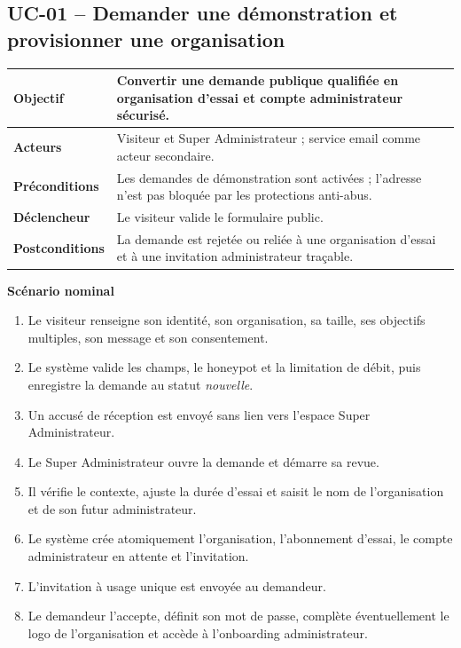 \subsection{UC-01 -- Demander une démonstration et provisionner une organisation}

\begin{table}[H]
  \centering
  \begin{tabularx}{\textwidth}{|C{3.3cm}|Y|}
    \hline
    \textbf{Objectif} & Convertir une demande publique qualifiée en organisation
    d'essai et compte administrateur sécurisé.\\\hline
    \textbf{Acteurs} & Visiteur et Super Administrateur ; service email comme acteur
    secondaire.\\\hline
    \textbf{Préconditions} & Les demandes de démonstration sont activées ; l'adresse
    n'est pas bloquée par les protections anti-abus.\\\hline
    \textbf{Déclencheur} & Le visiteur valide le formulaire public.\\\hline
    \textbf{Postconditions} & La demande est rejetée ou reliée à une organisation
    d'essai et à une invitation administrateur traçable.\\\hline

  \end{tabularx}
\end{table}

\textbf{Scénario nominal}
\begin{enumerate}[leftmargin=8mm]
  \item Le visiteur renseigne son identité, son organisation, sa taille, ses objectifs
  multiples, son message et son consentement.
  \item Le système valide les champs, le honeypot et la limitation de débit, puis
  enregistre la demande au statut \emph{nouvelle}.
  \item Un accusé de réception est envoyé sans lien vers l'espace Super Administrateur.
  \item Le Super Administrateur ouvre la demande et démarre sa revue.
  \item Il vérifie le contexte, ajuste la durée d'essai et saisit le nom de
  l'organisation et de son futur administrateur.
  \item Le système crée atomiquement l'organisation, l'abonnement d'essai, le compte
  administrateur en attente et l'invitation.
  \item L'invitation à usage unique est envoyée au demandeur.
  \item Le demandeur l'accepte, définit son mot de passe, complète éventuellement le
  logo de l'organisation et accède à l'onboarding administrateur.
\end{enumerate}

